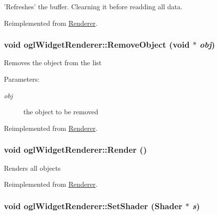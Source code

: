 'Refreshes' the buffer. Clearning it before readding all data. 

Reimplemented from \hyperlink{class_renderer_025a064cb583ac6677a4b9a6099e0378}{Renderer}.\hypertarget{classogl_widget_renderer_8438aacf8a1c70dcf1eb5879742d20e8}{
\subsubsection[{RemoveObject}]{\setlength{\rightskip}{0pt plus 5cm}void oglWidgetRenderer::RemoveObject (void $\ast$ {\em obj})}}
\label{classogl_widget_renderer_8438aacf8a1c70dcf1eb5879742d20e8}


Removes the object from the list \begin{Desc}
\item[Parameters:]
\begin{description}
\item[{\em obj}]the object to be removed \end{description}
\end{Desc}


Reimplemented from \hyperlink{class_renderer_28f5bf024a4772cff537683690f62f42}{Renderer}.\hypertarget{classogl_widget_renderer_fb83427aa814bf2a18f3abded3161bc5}{
\subsubsection[{Render}]{\setlength{\rightskip}{0pt plus 5cm}void oglWidgetRenderer::Render ()}}
\label{classogl_widget_renderer_fb83427aa814bf2a18f3abded3161bc5}


Renders all objects 

Reimplemented from \hyperlink{class_renderer_ae3d98a69fb55e9042306ba1621cd8d5}{Renderer}.\hypertarget{classogl_widget_renderer_5a63ddb69bee3f4a01510a27a9c2237b}{
\subsubsection[{SetShader}]{\setlength{\rightskip}{0pt plus 5cm}void oglWidgetRenderer::SetShader ({\bf Shader} $\ast$ {\em s})}}
\label{classogl_widget_renderer_5a63ddb69bee3f4a01510a27a9c2237b}


